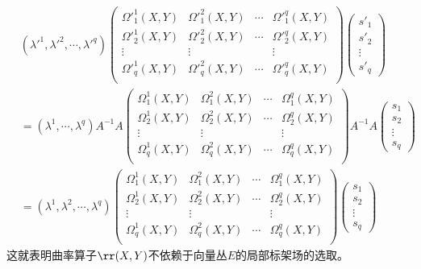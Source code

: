 \[
\begin{split}
&\left(\lambda'^{1},\lambda'^{2},\cdots,\lambda'^{q} \right)\left( \begin{array}{cccc}{\Omega'^{1}_{1}(X,Y)} & {\Omega'^{2}_{1}(X,Y)}&{\cdots}&{\Omega'^{q}_{1}(X,Y)}\\ {\Omega'^{1}_{2}(X,Y)} & {\Omega'^{2}_{2}(X,Y)}&{\cdots}&{\Omega'^{q}_{2}(X,Y)}\\ {\vdots} & {\vdots}&{ }&{\vdots}\\{\Omega'^{1}_{q}(X,Y)} & {\Omega'^{2}_{q}(X,Y)}&{\cdots}&{\Omega'^{q}_{q}(X,Y)}\\ \end{array}\right)\left( \begin{array}{cccc}{s'_{1}} \\{s'_{2}}\\ {\vdots}  \\ {s'_{q}} \end{array}\right)\\
&=\left(\lambda^{1},\cdots,\lambda^{q} \right)  A^{-1}  A 
\left( \begin{array}{cccc}{\Omega^{1}_{1}(X,Y)} & {\Omega^{2}_{1}(X,Y)}&{\cdots}&{\Omega^{q}_{1}(X,Y)}\\ {\Omega^{1}_{2}(X,Y)} & {\Omega^{2}_{2}(X,Y)}&{\cdots}&{\Omega^{q}_{2}(X,Y)}\\ {\vdots} & {\vdots}&{ }&{\vdots}\\{\Omega^{1}_{q}(X,Y)} & {\Omega^{2}_{q}(X,Y)}&{\cdots}&{\Omega^{q}_{q}(X,Y)}\\ \end{array}\right)
  A^{-1}  A\left( \begin{array}{cccc}{s_{1}} \\{s_{2}}\\ {\vdots}  \\ {s_{q}} \end{array}\right)\\
  &=\left(\lambda^{1},\lambda^{2},\cdots,\lambda^{q} \right)\left( \begin{array}{cccc}{\Omega^{1}_{1}(X,Y)} & {\Omega^{2}_{1}(X,Y)}&{\cdots}&{\Omega^{q}_{1}(X,Y)}\\ {\Omega^{1}_{2}(X,Y)} & {\Omega^{2}_{2}(X,Y)}&{\cdots}&{\Omega^{q}_{2}(X,Y)}\\ {\vdots} & {\vdots}&{ }&{\vdots}\\{\Omega^{1}_{q}(X,Y)} & {\Omega^{2}_{q}(X,Y)}&{\cdots}&{\Omega^{q}_{q}(X,Y)}\\ \end{array}\right)\left( \begin{array}{cccc}{s_{1}} \\{s_{2}}\\ {\vdots}  \\ {s_{q}} \end{array}\right)
\end{split}
\]
这就表明曲率算子$\rr(X,Y)$不依赖于向量丛$E$的局部标架场的选取。

